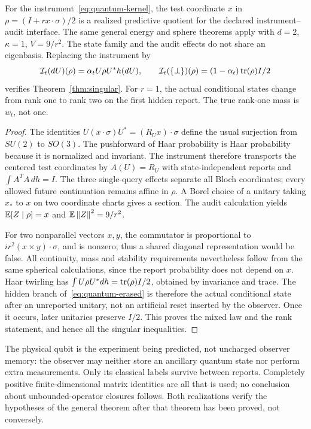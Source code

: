 \begin{theorem}\label{thm:quantum}
For the instrument~\eqref{eq:quantum-kernel}, the test coordinate $x$ in $\rho=(I+r x\cdot\sigma)/2$ is a realized predictive quotient for the declared instrument--audit interface. The same general energy and sphere theorems apply with $d=2$, $\kappa=1$, $V=9/r^2$. The state family and the audit effects do not share an eigenbasis. Replacing the instrument by
\begin{equation}\label{eq:quantum-erased}
 \mathcal I_t(dU)(\rho)=\alpha_t U\rho U^*h(dU),\qquad
 \mathcal I_t(\{\bot\})(\rho)=(1-\alpha_t)\operatorname{tr}(\rho)I/2
\end{equation}
verifies Theorem~\ref{thm:singular}. For $r=1$, the actual conditional states change from rank one to rank two on the first hidden report. The true rank-one mass is $w_t$, not one.
\end{theorem}
\begin{proof}
The identities $U(x\cdot\sigma)U^*=(R_Ux)\cdot\sigma$ define the usual surjection from $SU(2)$ to $SO(3)$. The pushforward of Haar probability is Haar probability because it is normalized and invariant. The instrument therefore transports the centered test coordinates by $A(U)=R_U$ with state-independent reports and $\int A^TA\,dh=I$. The three single-query effects separate all Bloch coordinates; every allowed future continuation remains affine in $\rho$. A Borel choice of a unitary taking $x_*$ to $x$ on two coordinate charts gives a section. The audit calculation yields $\mathbb E[Z\mid\rho]=x$ and $\mathbb E\left\lVert Z\right\rVert^2=9/r^2$.

For two nonparallel vectors $x,y$, the commutator is proportional to $i r^2(x\times y)\cdot\sigma$, and is nonzero; thus a shared diagonal representation would be false. All continuity, mass and stability requirements nevertheless follow from the same spherical calculations, since the report probability does not depend on $x$. Haar twirling has $\int U\rho U^*dh=\operatorname{tr}(\rho)I/2$, obtained by invariance and trace. The hidden branch of~\eqref{eq:quantum-erased} is therefore the actual conditional state after an unreported unitary, not an artificial reset inserted by the observer. Once it occurs, later unitaries preserve $I/2$. This proves the mixed law and the rank statement, and hence all the singular inequalities.
\end{proof}
The physical qubit is the experiment being predicted, not uncharged observer memory: the observer may neither store an ancillary quantum state nor perform extra measurements. Only its classical labels survive between reports. Completely positive finite-dimensional matrix identities are all that is used; no conclusion about unbounded-operator closures follows. Both realizations verify the hypotheses of the general theorem after that theorem has been proved, not conversely.

